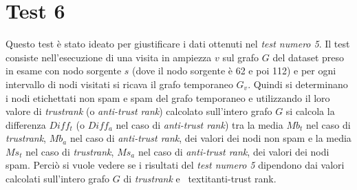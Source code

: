 \section{Test 6}
Questo test è stato ideato per giustificare i dati ottenuti nel \textit{test numero 5}. Il test consiste nell'esecuzione di una visita in ampiezza \(v\) sul grafo \(G\) del dataset preso in esame con nodo sorgente \(s\) (dove il nodo sorgente è 62 e poi 112) e per ogni intervallo di nodi visitati si ricava il grafo temporaneo \(G_v\). Quindi si determinano i nodi etichettati non spam e spam del grafo temporaneo e utilizzando il loro valore di \textit{trustrank}  (o \textit{anti-trust rank}) calcolato sull'intero grafo \(G\) si calcola la differenza \(Diff_t\) (o \(Diff_a\) nel caso di \textit{anti-trust rank}) tra la media \(Mb_t\) nel caso di \textit{trustrank}, \(Mb_a\) nel caso di \textit{anti-trust rank}, dei valori dei nodi non spam e la media \(Ms_t\) nel caso di \textit{trustrank}, \(Ms_a\) nel caso di \textit{anti-trust rank}, dei valori dei nodi spam. Perciò si vuole vedere se i risultati del \textit{test numero 5} dipendono dai valori calcolati sull'intero grafo \(G\) di \textit{trustrank} e \
textit{anti-trust rank}.
